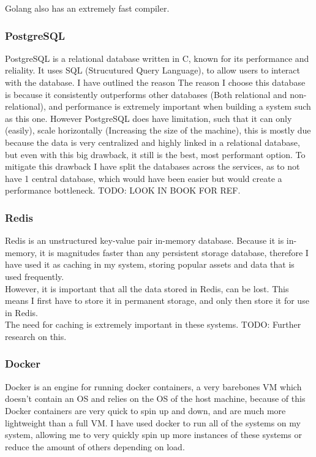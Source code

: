 \documentclass[titlepage]{article}
\begin{document}
Golang also has an extremely fast compiler.

\subsubsection{PostgreSQL}
PostgreSQL is a relational database written in C, known for its performance and reliality. It uses SQL (Strucutured Query Language), to allow users to interact with the database. I have outlined the reason The reason I choose this database is because it consistently outperforms other databases (Both relational and non-relational), and performance is extremely important when building a system such as this one. However PostgreSQL does have limitation, such that it can only (easily), scale horizontally (Increasing the size of the machine), this is mostly due because the data is very centralized and highly linked in a relational database, but even with this big drawback, it still is the best, most performant option. To mitigate this drawback I have split the databases across the services, as to not have 1 central database, which would have been easier but would create a performance bottleneck. TODO: LOOK IN BOOK FOR REF.

\subsubsection{Redis}
Redis is an unstructured key-value pair in-memory database. Because it is in-memory, it is magnitudes faster than any persistent storage database, therefore I have used it as caching in my system, storing popular assets and data that is used frequently. \\
However, it is important that all the data stored in Redis, can be lost. This means I first have to store it in permanent storage, and only then store it for use in Redis. \\

The need for caching is extremely important in these systems. TODO: Further research on this.

\subsubsection{Docker}
Docker is an engine for running docker containers, a very barebones VM which doesn't contain an OS and relies on the OS of the host machine, because of this Docker containers are very quick to spin up and down, and are much more lightweight than a full VM. I have used docker to run all of the systems on my system, allowing me to very quickly spin up more instances of these systems or reduce the amount of others depending on load. \\
\end{document}
